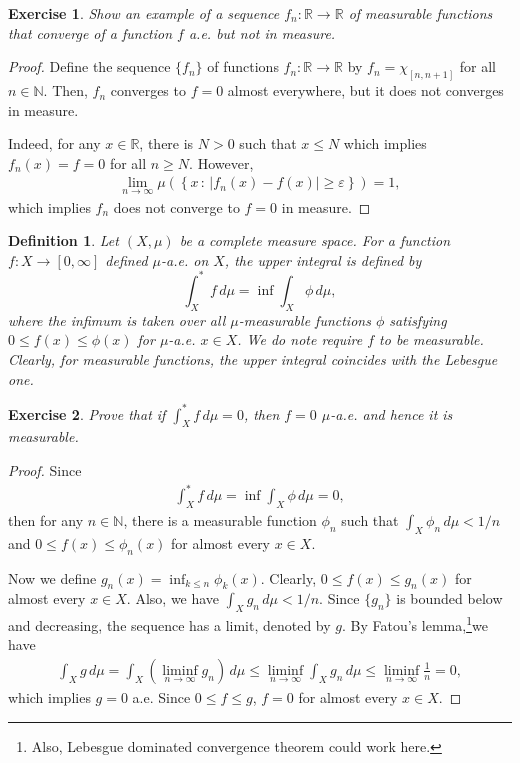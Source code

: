 \documentclass[11pt]{book}
\newtheorem{definition}{Definition}[chapter]
\newtheorem{exercise}{Exercise}[section]
\theoremstyle{definition}
\numberwithin{equation}{chapter}
\begin{document}
\medskip

\begin{exercise}
Show an example of a sequence $f_n: \mathbb{R} \to \mathbb{R}$ of measurable functions that converge of a function $f$ a.e. but not in measure.
\end{exercise}
\begin{proof}
Define the sequence $\{f_n\}$ of functions $f_n: \mathbb{R} \to \mathbb{R}$ by $f_n = \chi_{[n,n+1]}$ for all $n \in \mathbb{N}$. Then, $f_n$ converges to $f = 0$ almost everywhere, but it does not converges in measure.

Indeed, for any $x \in \mathbb{R}$, there is $N > 0$ such that $x \leq N$ which implies $f_n(x) = f = 0$ for all $n \geq N$. However, 
\begin{align*}
    \lim_{n\to\infty} \mu\left(\left\{x \,:\, \left|f_n(x) - f(x)\right| \geq \varepsilon \right\}\right) = 1,
\end{align*}
which implies $f_n$ does not converge to $f = 0$ in measure.
\end{proof}

\medskip

\begin{definition}
Let $(X,\mu)$ be a complete measure space.
For a function $f : X \to [0,\infty]$ defined $\mu$-a.e. on $X$, the upper integral is defined by
$$\int^*_X f \,d\mu = \inf \int_X \phi \,d\mu,$$
where the infimum is taken over all $\mu$-measurable functions $\phi$ satisfying $0 \leq f(x) \leq \phi(x)$ for $\mu$-a.e. $x \in X$.
We do note require $f$ to be measurable. Clearly, for measurable functions, the upper integral coincides with the Lebesgue one.
\end{definition}

\medskip

\begin{exercise}
Prove that if $\int_X^* f \,d\mu=0$, then $f = 0$ $\mu$-a.e. and hence it is measurable.
\end{exercise}
\begin{proof}
Since
\begin{align*}
    \int^*_X f \,d\mu = \inf \int_X \phi \,d\mu = 0,
\end{align*}
then for any $n \in \mathbb{N}$, there is a measurable function $\phi_n$ such that $\int_X \phi_n \,d\mu < 1/n$ and $0 \leq f(x) \leq \phi_n(x)$ for almost every $x \in X$. 

Now we define $g_n(x) = \inf_{k\leq n} \phi_k(x)$. Clearly, $0 \leq f(x) \leq g_n(x)$ for almost every $x \in X$. Also, we have $\int_X g_n \,d\mu < 1/n$. Since $\{g_n\}$ is bounded below and decreasing, the sequence has a limit, denoted by $g$. By Fatou's lemma,\footnote{Also, Lebesgue dominated convergence theorem could work here.}we have
\begin{align*}
    \int_X g \,d\mu = \int_X \left(\liminf_{n\to\infty} g_n\right) \,d\mu \leq \liminf_{n\to\infty} \int_X g_n \,d\mu \leq \liminf_{n\to\infty} \frac{1}{n} = 0,
\end{align*}
which implies $g = 0$ a.e. Since $0 \leq f \leq g$, $f = 0$ for almost every $x \in X$.
\end{proof}
\end{document}
